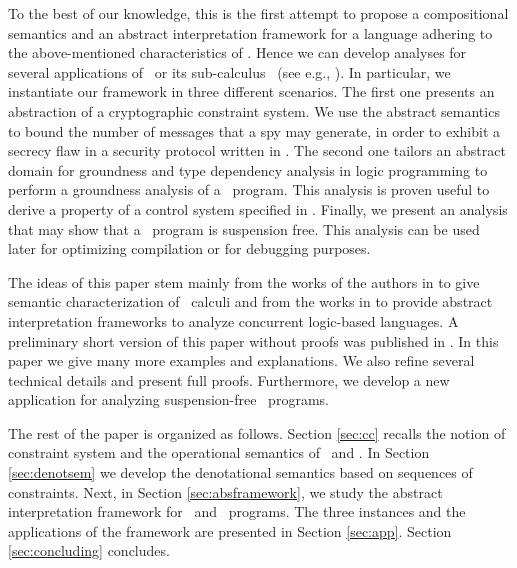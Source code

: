 \documentclass{tlp}
\begin{document}
To the best of our knowledge,  this is the first attempt to propose a compositional semantics and an abstract interpretation framework  for a language adhering to the above-mentioned characteristics of  \utcc.  Hence we can develop 
analyses for several applications of \utcc\ or its sub-calculus 
\tccp\  (see e.g., \cite{DBLP:journals/constraints/OlarteRV13}). In particular, we instantiate our framework in 
three different 
scenarios.  The first one presents 
an abstraction of  a cryptographic constraint system. We  use 
the abstract semantics to bound the number of messages that a spy may generate, in order  to exhibit  a secrecy flaw in a security protocol written 
in \utcc. The second one 
tailors an abstract domain for groundness and type dependency analysis in 
logic programming to perform a groundness analysis of a  \tccp\ program. This analysis is proven useful 
to derive a property of a control system specified
in \tccp.  Finally, we present an analysis that may show that a \tccp\ program is suspension free. This  analysis can be used later for optimizing compilation or for debugging purposes. 






The ideas of this paper stem mainly from the works of the authors in \cite{BoerPP95,Falaschi:97:TCS,DBLP:journals/iandc/FalaschiGMP97,NPV02,Olarte:08:PPDP}  to give semantic characterization of \ccp\ calculi and from the works in  
\cite{FalaschiGMP93,CFM94,Falaschi:97:TCS,ZaffanellaGL97,FalaschiOPV07} to provide abstract interpretation frameworks to analyze concurrent logic-based languages. A preliminary short version of this paper without proofs was 
published in \cite{Falaschi:PPDP:09}. In this paper we give many more examples and explanations. We also refine several  technical details and present full proofs. Furthermore, we develop a new application 
for analyzing suspension-free \tccp\ programs. 

The rest of the paper is organized as follows. Section \ref{sec:cc} recalls the notion of constraint 
system and the operational semantics of \tccp\ and  \utcc. 
In Section \ref{sec:denotsem}  we  develop  the denotational semantics based on 
sequences of constraints. Next, in 
Section \ref{sec:absframework}, we study the abstract interpretation framework 
for \tccp\ and \utcc\ programs.  The three instances and 
the applications of the framework 
are presented in Section \ref{sec:app}. Section \ref{sec:concluding} concludes. 
\end{document}
